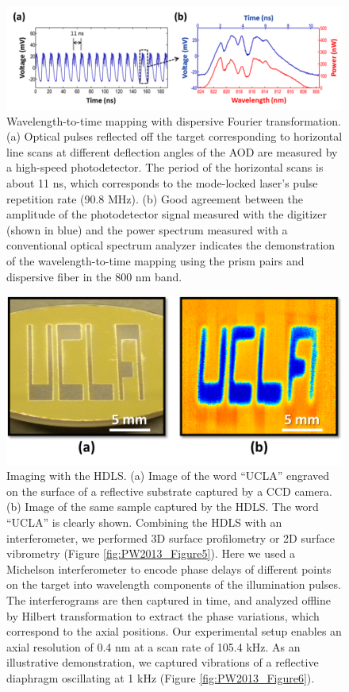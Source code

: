 \begin{figure}[htb!]
\centering
\includegraphics[scale=0.65]{PW2013/Figure3.png}
\caption{Wavelength-to-time mapping with dispersive Fourier transformation. (a) Optical pulses reflected off the target corresponding to horizontal line scans at different deflection angles of the AOD are measured by a high-speed photodetector. The period of the horizontal scans is about 11 ns, which corresponds to the mode-locked laser’s pulse repetition rate (90.8 MHz). (b) Good agreement between the amplitude of the photodetector signal measured with the digitizer (shown in blue) and the power spectrum measured with a conventional optical spectrum analyzer indicates the demonstration of the wavelength-to-time mapping using the prism pairs and dispersive fiber in the 800 nm band.}
\label{fig:PW2013_Figure3}
\end{figure}

\begin{figure}[htb!]
\centering
\includegraphics[scale=0.9]{PW2013/Figure4.png}
\caption{Imaging with the HDLS. (a) Image of the word “UCLA” engraved on the surface of a reflective substrate captured by a CCD camera. (b) Image of the same sample captured by the HDLS. The word “UCLA” is clearly shown. 
Combining the HDLS with an interferometer, we performed 3D surface profilometry or 2D surface vibrometry (Figure \ref{fig:PW2013_Figure5}). Here we used a Michelson interferometer to encode phase delays of different points on the target into wavelength components of the illumination pulses. The interferograms are then captured in time, and analyzed offline by Hilbert transformation to extract the phase variations, which correspond to the axial positions. Our experimental setup enables an axial resolution of 0.4 nm at a scan rate of 105.4 kHz. As an illustrative demonstration, we captured vibrations of a reflective diaphragm oscillating at 1 kHz (Figure \ref{fig:PW2013_Figure6}).}
\label{fig:PW2013_Figure4}
\end{figure}
 
